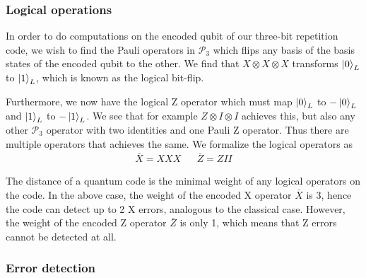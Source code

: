 \subsubsection{Logical operations}

In order to do computations on the encoded qubit of our three-bit repetition code, we wish to find the Pauli operators in $\mathcal{P}_3$ which flips any basis of the basis states of the encoded qubit to the other. We find that $X\otimes X\otimes X$ transforms $\ket{0}_L$ to $\ket{1}_L$, which is known as the logical bit-flip.

Furthermore, we now have the logical Z operator which must map $\ket{0}_L$ to $-\ket{0}_L$ and $\ket{1}_L$ to $-\ket{1}_L$. We see that for example $Z\otimes I\otimes I$ achieves this, but also any other $\mathcal{P}_3$ operator with two identities and one Pauli Z operator. Thus there are multiple operators that achieves the same. We formalize the logical operators as
\begin{align}\label{eq:qec_3bitlogical}
  \bar{X} = XXX && \bar{Z} = ZII
\end{align}

The distance of a quantum code is the minimal weight of any logical operators on the code. In the above case, the weight of the encoded X operator $\bar{X}$ is 3, hence the code can detect up to 2 X errors, analogous to the classical case. However, the weight of the encoded Z operator $\bar{Z}$ is only 1, which means that Z errors cannot be detected at all.

\subsubsection{Error detection}

